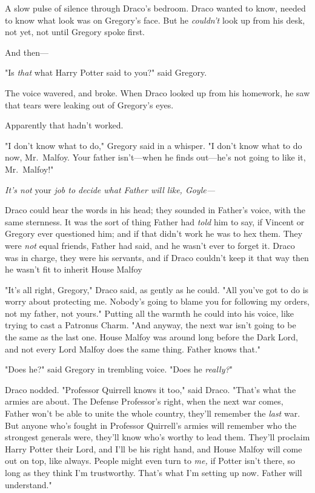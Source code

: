 A slow pulse of silence through Draco's bedroom. Draco wanted to know, needed
to know what look was on Gregory's face. But he \emph{couldn't} look up from
his desk, not yet, not until Gregory spoke first.

And then---

"Is \emph{that} what Harry Potter said to you?" said Gregory.

The voice wavered, and broke. When Draco looked up from his homework, he saw
that tears were leaking out of Gregory's eyes.

Apparently that hadn't worked.

"I don't know what to do," Gregory said in a whisper. "I don't know what to do
now, Mr.~Malfoy. Your father isn't---when he finds out---he's not going to like
it, Mr.~Malfoy!"

\emph{It's not} your \emph{job to decide what Father will like, Goyle---}

Draco could hear the words in his head; they sounded in Father's voice, with
the same sternness. It was the sort of thing Father had \emph{told} him to say,
if Vincent or Gregory ever questioned him; and if that didn't work he was to
hex them. They were \emph{not} equal friends, Father had said, and he wasn't
ever to forget it. Draco was in charge, they were his servants, and if Draco
couldn't keep it that way then he wasn't fit to inherit House Malfoy{\el}

"It's all right, Gregory," Draco said, as gently as he could. "All you've got
to do is worry about protecting me. Nobody's going to blame you for following
my orders, not my father, not yours." Putting all the warmth he could into his
voice, like trying to cast a Patronus Charm. "And anyway, the next war isn't
going to be the same as the last one. House Malfoy was around long before the
Dark Lord, and not every Lord Malfoy does the same thing. Father knows that."

"Does he?" said Gregory in trembling voice. "Does he \emph{really?}"

Draco nodded. "Professor Quirrell knows it too," said Draco. "That's what the
armies are about. The Defense Professor's right, when the next war comes,
Father won't be able to unite the whole country, they'll remember the
\emph{last} war. But anyone who's fought in Professor Quirrell's armies will
remember who the strongest generals were, they'll know who's worthy to lead
them. They'll proclaim Harry Potter their Lord, and I'll be his right hand, and
House Malfoy will come out on top, like always. People might even turn to
\emph{me,} if Potter isn't there, so long as they think I'm trustworthy. That's
what I'm setting up now. Father will understand."

